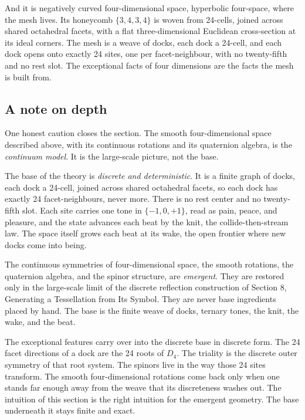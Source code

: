 And it is negatively curved four-dimensional space, hyperbolic four-space, where the mesh lives. Its honeycomb $\{3,4,3,4\}$ is woven from 24-cells, joined across shared octahedral facets, with a flat three-dimensional Euclidean cross-section at its ideal corners. The mesh is a weave of docks, each dock a 24-cell, and each dock opens onto exactly 24 sites, one per facet-neighbour, with no twenty-fifth and no rest slot. The exceptional facts of four dimensions are the facts the mesh is built from.

\subsection{A note on depth}

One honest caution closes the section. The smooth four-dimensional space described above, with its continuous rotations and its quaternion algebra, is the \emph{continuum model}. It is the large-scale picture, not the base.

The base of the theory is \emph{discrete and deterministic}. It is a finite graph of docks, each dock a 24-cell, joined across shared octahedral facets, so each dock has exactly 24 facet-neighbours, never more. There is no rest center and no twenty-fifth slot. Each site carries one tone in $\{-1, 0, +1\}$, read as pain, peace, and pleasure, and the state advances each beat by the knit, the collide-then-stream law. The space itself grows each beat at its wake, the open frontier where new docks come into being.

\begin{result}
The continuous symmetries of four-dimensional space, the smooth rotations, the quaternion algebra, and the spinor structure, are \emph{emergent}. They are restored only in the large-scale limit of the discrete reflection construction of Section 8, Generating a Tessellation from Its Symbol. They are never base ingredients placed by hand. The base is the finite weave of docks, ternary tones, the knit, the wake, and the beat.
\end{result}

The exceptional features carry over into the discrete base in discrete form. The 24 facet directions of a dock are the 24 roots of $D_4$. The triality is the discrete outer symmetry of that root system. The spinors live in the way those 24 sites transform. The smooth four-dimensional rotations come back only when one stands far enough away from the weave that its discreteness washes out. The intuition of this section is the right intuition for the emergent geometry. The base underneath it stays finite and exact.

